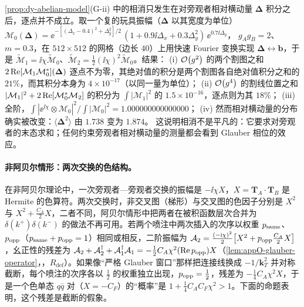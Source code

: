 \begin{example}\label{ex:dy-glauber-model}
\cref{prop:dy-abelian-model}(G-ii) 中的相消只发生在对旁观者相对横动量 $\boldsymbol\Delta$ 积分之后，逐点并不成立。取一个复的玩具振幅（$\boldsymbol\Delta$ 以其宽度为单位）
$\mathcal M_0(\boldsymbol\Delta)=\ee^{-[(\Delta_x-0.4)^2+\Delta_y^2]/2}\,(1+0.9\ii\Delta_x+0.3\Delta_y^2)\,\ee^{0.7\ii\Delta_y}$，
$g_Ag_B=2$、$m=0.3$，在 $512\times512$ 的网格（边长 $40$）上用快速 Fourier 变换实现 $\boldsymbol\Delta\leftrightarrow\boldsymbol b$，于是 $\tilde{\mathcal M}_1=\ii\chi\tilde{\mathcal M}_0$、$\tilde{\mathcal M}_2=\frac12(\ii\chi)^2\tilde{\mathcal M}_0$。结果：
(i) $\mathcal{O}\!\left(g^2\right)$ 的两个割图之和 $2\operatorname{Re}[\mathcal M_1\mathcal M_0^*](\boldsymbol\Delta)$ 逐点不为零，其绝对值的积分是两个割图各自绝对值积分之和的 $21\%$，而其积分本身为 $4\times10^{-17}$（以同一量为单位）；
(ii) $\mathcal{O}\!\left(g^4\right)$ 的割线位置之和 $|\mathcal M_1|^2+2\operatorname{Re}[\mathcal M_0^*\mathcal M_2]$ 的积分为 $\int|\mathcal M_1|^2$ 的 $1.5\times10^{-16}$，逐点则为其 $18\%$；
(iii) 全阶，$\int|\ee^{\ii\chi}\otimes\mathcal M_0|^2/\int|\mathcal M_0|^2=1.000000000000000$；
(iv) 然而相对横动量的分布确实被改变：$\langle\boldsymbol\Delta^2\rangle$ 由 $1.738$ 变为 $1.874$。
这说明相消不是平凡的：它要求对旁观者的末态求和；任何约束旁观者相对横动量的测量都会看到 Glauber 相位的效应。
\end{example}

\paragraph{非阿贝尔情形：两次交换的色结构。}在非阿贝尔理论中，一次旁观者—旁观者交换的振幅是 $-\ii\chi X$，$X=\mathbf T_A\cdot\mathbf T_B$ 是 Hermite 的色算符。两次交换时，非交叉图（梯形）与交叉图的色因子分别是 $X^2$ 与 $X^2+\frac{C_A}2X$，二者不同，阿贝尔情形中把两者在被积函数层次合并为 $\delta(k^+)\delta(k^-)$ 的做法不再可用\cite[第~5.2.1~节]{RothsteinStewart2016}。若两个喷注中两次插入的次序以权重 $p_{\rm same}$、$p_{\rm opp}$（$p_{\rm same}+p_{\rm opp}=1$）相同或相反，二阶振幅为 $\mathcal A_2=\frac{(-\mathrm{i}\chi)^2}2\big[X^2+p_{\rm opp}\frac{C_A}2X\big]$，幺正性的残差为 $\mathcal A_2+\mathcal A_2^\dagger+\mathcal A_1^\dagger\mathcal A_1=-\frac12C_A\chi^2(\operatorname{Re} p_{\rm opp})X$（\cref{lem:appO-glauber-operator}，\tagR，$R_{\mathrm{def}}$）。如果像“严格 Glauber 窗口”那样把连接线换成 $-1/\mathbf k_T^2$ 并对称截断，每个喷注的次序各以 $\frac12$ 的权重独立出现，$p_{\rm opp}=\frac12$，残差为 $-\frac14C_A\chi^2X$，于是一个色单态 $q\bar q$ 对（$X=-C_F$）的“概率”是 $1+\frac14C_AC_F\chi^2>1$。下面的命题表明，这个残差是截断的假象。

